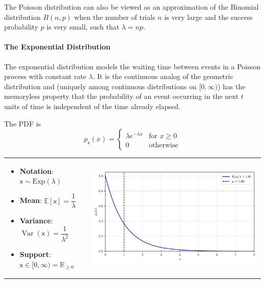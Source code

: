 The Poisson distribution can also be viewed as an approximation of the Binomial distribution $B(n, p)$ when the number of trials $n$ is very large and the success probability $p$ is very small, such that $\lambda = np$.

\paragraph*{The Exponential Distribution}
The exponential distribution models the waiting time between events in a Poisson process with constant rate $\lambda$. It is the continuous analog of the geometric distribution and (uniquely among continuous distributions on $[0,\infty)$) has the memoryless property that the probability of an event occurring in the next $t$ units of time is independent of the time already elapsed.

The PDF is
\begin{equation}
    p_{\mathsf{x}}(x) =
    \begin{cases}
        \lambda e^{-\lambda x} & \text{for } x \ge 0 \\[1ex]
        0 & \text{otherwise}
    \end{cases}
\end{equation}

\begin{tabular}{@{}>{\raggedright\arraybackslash}m{} >{\raggedleft\arraybackslash}m{}@{}}
\begin{itemize}
\item \textbf{Notation}: $\mathsf{x} \sim \mathrm{Exp}(\lambda)$
\item \textbf{Mean}: $\mathbb{E}[\mathsf{x}] = \dfrac{1}{\lambda}$
\item \textbf{Variance}: $\operatorname{Var}(\mathsf{x}) = \dfrac{1}{\lambda^2}$
\item \textbf{Support}: $\mathsf{x} \in [0, \infty) = \mathbb{R}_{\ge 0}$
\end{itemize}
&
\includegraphics[width=\linewidth]{figs/probability/exponential_pdf.pdf} \\
\end{tabular}

